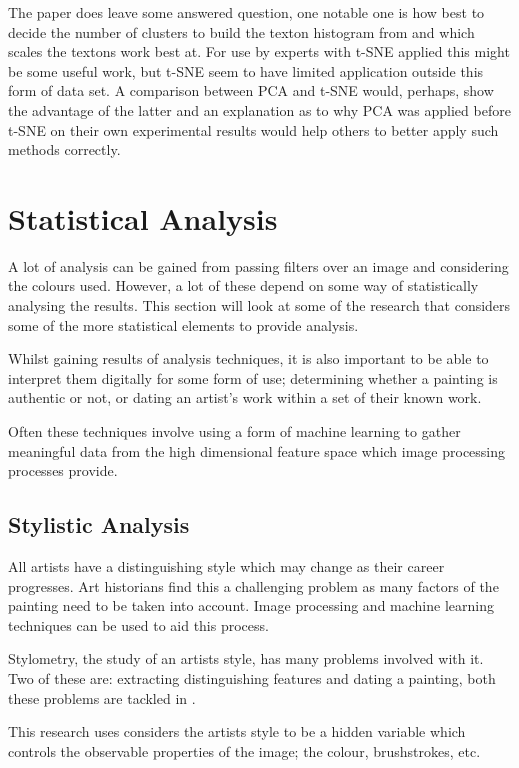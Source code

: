 \documentclass[conference]{IEEEtran}
\begin{document}
The paper does leave some answered question, one notable one is how best to
decide the number of clusters to build the texton histogram from and which
scales the textons work best at. For use by experts with \gls{t-SNE} applied
this might be some useful work, but \gls{t-SNE} seem to have limited
application outside this form of data set. A comparison between \gls{PCA} and
\gls{t-SNE} would, perhaps, show the advantage of the latter and an explanation
as to why \gls{PCA} was applied before \gls{t-SNE} on their own experimental
results would help others to better apply such methods correctly.

\section{Statistical Analysis}

A lot of analysis can be gained from passing filters over an image and
considering the colours used. However, a lot of these depend on some way of
statistically analysing the results. This section will look at some of the
research that considers some of the more statistical elements to provide
analysis.

Whilst gaining results of analysis techniques, it is also important to be able
to interpret them digitally for some form of use; determining whether a
painting is authentic or not, or dating an artist's work within a set of their
known work.

Often these techniques involve using a form of machine learning to gather
meaningful data from the high dimensional feature space which image processing
processes provide.

\subsection{Stylistic Analysis}

All artists have a distinguishing style which may change as their career
progresses. Art historians find this a challenging problem as many factors of
the painting need to be taken into account. Image processing and machine
learning techniques can be used to aid this process.

Stylometry, the study of an artists style, has many problems involved with it.
Two of these are: extracting distinguishing features and dating a
painting, both these problems are tackled in \cite{jafarpour2009stylistic}.

This research uses considers the artists style to be a hidden variable which
controls the observable properties of the image; the colour, brushstrokes, etc.
\end{document}
